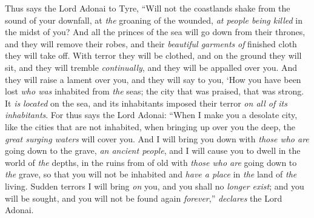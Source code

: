 \begin{biblechapter}
\verse Thus says the Lord Adonai to Tyre, “Will not the coastlands shake from the sound of your downfall, at \textit{the} groaning of the wounded, \textit{at people being killed} in the midst of you?
\verse And all the princes of the sea will go down from their thrones, and they will remove their robes, and their \textit{beautiful garments} \textit{of} finished cloth they will take off. With terror they will be clothed, and on the ground they will sit, and they will tremble \textit{continually}, and they will be appalled over you.
\verse And they will raise a lament over you, and they will say to you,
\verse ‘How you have been lost \textit{who was} inhabited from \textit{the} seas; 
the city that was praised, that was strong. 
It \textit{is} \textit{located} on the sea, 
and its inhabitants imposed their terror \textit{on all of its inhabitants}.
\verse For thus says the Lord Adonai: “When I make you a desolate city, like the cities that are not inhabited, when bringing up over you the deep, the \textit{great surging waters} will cover you.
\verse And I will bring you down with \textit{those who are} going down to the grave, \textit{an ancient people}, and I will cause you to dwell in the world of \textit{the} depths, in the ruins from of old with \textit{those who are} going down to \textit{the} grave, so that you will not be inhabited and \textit{have a place} in \textit{the} land of \textit{the} living.
\verse Sudden terrors I will bring \textit{on} you, and you shall no \textit{longer exist}; and you will be sought, and you will not be found again \textit{forever},” \textit{declares} the Lord Adonai.
\end{biblechapter}

